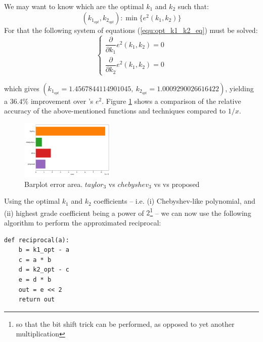 We may want to know which are the optimal $k_1$ and $k_2$ such that:
\begin{equation}\label{equ:opt_k1_k2_eq}
(k_{1_{opt}}, k_{2_{opt}}): \min\{e^2(k_1, k_2)\}
\end{equation} 
For that the following system of equations (\ref{equ:opt_k1_k2_eq}) must be solved:
\begin{equation}\label{equ:opt_k1_k2_eq_partial}
\begin{cases}
\dfrac{\partial}{\partial k_1} e^2(k_1, k_2) = 0 \\
\dfrac{\partial}{\partial k_2} e^2(k_1, k_2) = 0
\end{cases}
\end{equation} 

which gives $(k_{1_{opt}} = 1.4567844114901045,\ k_{2_{opt}} = 1.0009290026616422)$, yielding a $36.4\%$ improvement over \cite{drom}'s $e^2$. Figure \ref{fig:are_barplot} shows a comparison of the relative accuracy of the above-mentioned functions and techniques compared to $1/x$.
\begin{figure}
    \begin{center}
    \includegraphics[width=0.4\textwidth]{figures/barplot_area_error.pdf}
    \caption{Barplot error area. $taylor_3$ vs $chebyshev_3$ vs \cite{drom} vs proposed}
    \label{fig:are_barplot}
    \end{center}
\end{figure}
Using the optimal $k_1$ and $k_2$ coefficients -- i.e. (i) Chebyshev-like polynomial, and (ii) highest grade coefficient being a power of $2$\footnote{so that the bit shift trick can be performed, as opposed to yet another multiplication} -- we can now use the following algorithm to perform the approximated reciprocal:
\begin{lstlisting}[label=alg:reciprocal_approx_modified_drom]
def reciprocal(a):
    b = k1_opt - a
    c = a * b
    d = k2_opt - c
    e = d * b
    out = e << 2
    return out
\end{lstlisting}
